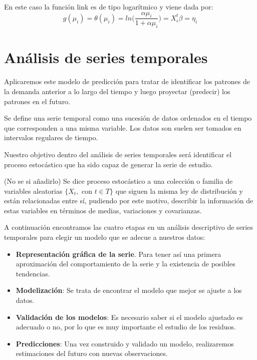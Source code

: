 \documentclass[12pt,a4paper,]{book}
\providecommand{\tightlist}{%
  \setlength{\itemsep}{0pt}\setlength{\parskip}{0pt}}
\numberwithin{dummy}{section}
\theoremstyle{ocrenumbox}
\theoremstyle{blacknumex}
\theoremstyle{blacknumbox}
\theoremstyle{ocrenum}
\theoremstyle{ocrenum}
\begin{document}
En este caso la función link es de tipo logarítmico y viene dada por: \[
g(\mu_i)= \theta(\mu_i) = ln \Big( \dfrac{\alpha \mu_i}{1+ \alpha\mu_i}   \Big) = X_i^t\beta = \eta_i 
\]

\hypertarget{anuxe1lisis-de-series-temporales}{%
\section{Análisis de series
temporales}\label{anuxe1lisis-de-series-temporales}}

Aplicaremos este modelo de predicción para tratar de identificar los
patrones de la demanda anterior a lo largo del tiempo y luego proyectar
(predecir) los patrones en el futuro.

Se define una serie temporal como una sucesión de datos ordenados en el
tiempo que corresponden a una misma variable. Los datos son suelen ser
tomados en intervalos regulares de tiempo.

Nuestro objetivo dentro del análisis de series temporales será
identificar el proceso estocástico que ha sido capaz de generar la serie
de estudio.

(No se si añadirlo) Se dice proceso estocástico a una colección o
familia de variables aleatorias \(\{X_t, \text{ con } t \in T \}\) que
siguen la misma ley de distribución y están relacionadas entre sí,
pudiendo por este motivo, describir la información de estas variables en
términos de medias, variaciones y covarianzas.

A continuación encontramos las cuatro etapas en un análisis descriptivo
de series temporales para elegir un modelo que se adecue a nuestros
datos:

\begin{itemize}
\tightlist
\item
  \textbf{Representación gráfica de la serie}. Para tener así una
  primera aproximación del comportamiento de la serie y la existencia de
  posibles tendencias.
\item
  \textbf{Modelización}: Se trata de encontrar el modelo que mejor se
  ajuste a los datos.
\item
  \textbf{Validación de los modelos}: Es necesario saber si el modelo
  ajustado es adecuado o no, por lo que es muy importante el estudio de
  los residuos.
\item
  \textbf{Predicciones}: Una vez construido y validado un modelo,
  realizaremos estimaciones del futuro con nuevas observaciones.
\end{itemize}
\end{document}
